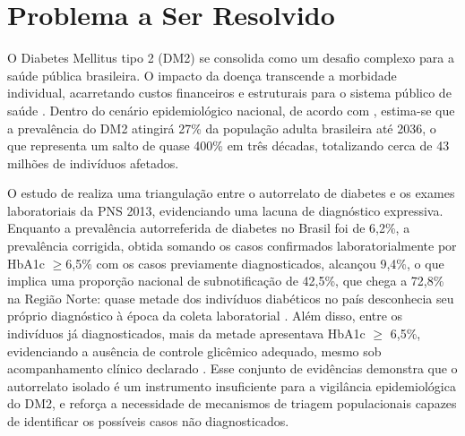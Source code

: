 \section{Problema a Ser Resolvido}

O Diabetes Mellitus tipo 2 (DM2) se consolida como um desafio complexo para a saúde pública brasileira. O impacto da doença transcende a morbidade individual, acarretando custos financeiros e estruturais para o sistema público de saúde \cite{bezerra2025morbidade}. Dentro do cenário epidemiológico nacional, de acordo com \textcite{moreira2024predicting}, estima-se que a prevalência do DM2 atingirá 27\% da população adulta brasileira até 2036, o que representa um salto de quase 400\% em três décadas, totalizando cerca de 43 milhões de indivíduos afetados.

O estudo de \textcite{muzy2021prevalencia} realiza uma triangulação entre o autorrelato de diabetes e os exames laboratoriais da PNS 2013, evidenciando uma lacuna de diagnóstico expressiva. Enquanto a prevalência autorreferida de diabetes no Brasil foi de 6,2\%, a prevalência corrigida, obtida somando os casos confirmados laboratorialmente por HbA1c $\geq $6,5\% com os casos previamente diagnosticados, alcançou 9,4\%, o que implica uma proporção nacional de subnotificação de 42,5\%, que chega a 72,8\% na Região Norte: quase metade dos indivíduos diabéticos no país desconhecia seu próprio diagnóstico à época da coleta laboratorial \cite{muzy2021prevalencia}. Além disso, entre os indivíduos já diagnosticados, mais da metade apresentava HbA1c $\geq$ 6,5\%, evidenciando a ausência de controle glicêmico adequado, mesmo sob acompanhamento clínico declarado \cite{muzy2021prevalencia}. Esse conjunto de evidências demonstra que o autorrelato isolado é um instrumento insuficiente para a vigilância epidemiológica do DM2, e reforça a necessidade de mecanismos de triagem populacionais capazes de identificar os possíveis casos não diagnosticados.

